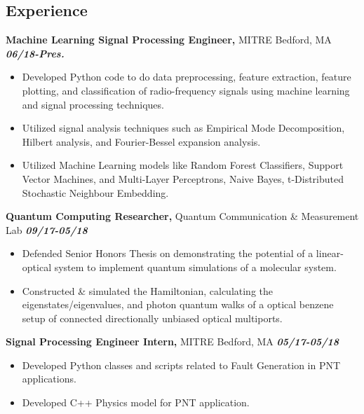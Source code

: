 \documentclass[margin]{res}
\begin{document}
\begin{resume}
\section{Experience}
{\bf Machine Learning Signal Processing Engineer,} MITRE Bedford, MA \hfill \textbf{\textit{06/18-Pres.}}
\begin{itemize}  pt
    \item Developed Python code to do data preprocessing, feature extraction, feature plotting, and classification of radio-frequency signals using machine learning and signal processing techniques.
    \item Utilized signal analysis techniques such as Empirical Mode Decomposition, Hilbert analysis, and Fourier-Bessel expansion analysis.
    \item Utilized Machine Learning models like Random Forest Classifiers, Support Vector Machines, and Multi-Layer Perceptrons, Naive Bayes, t-Distributed Stochastic Neighbour Embedding.
\end{itemize}







{\bf Quantum Computing Researcher,} Quantum Communication \& Measurement Lab \hfill  \textbf{\textit{09/17-05/18}}
\begin{itemize}  pt
\item Defended Senior Honors Thesis on demonstrating the potential of a linear-optical system to implement quantum simulations of a molecular system.
\item Constructed \& simulated the Hamiltonian, calculating the eigenstates/eigenvalues, and photon quantum walks of a optical benzene setup of connected directionally unbiased optical multiports.
\end{itemize}



 {\bf Signal Processing Engineer Intern,} MITRE Bedford, MA \hfill \textbf{\textit{05/17-05/18}}
 \begin{itemize}  pt  %
 \item Developed Python classes and scripts related to Fault Generation in PNT applications.
 \item Developed C++ Physics model for PNT application.
 \end{itemize}




\end{resume}
\end{document}
